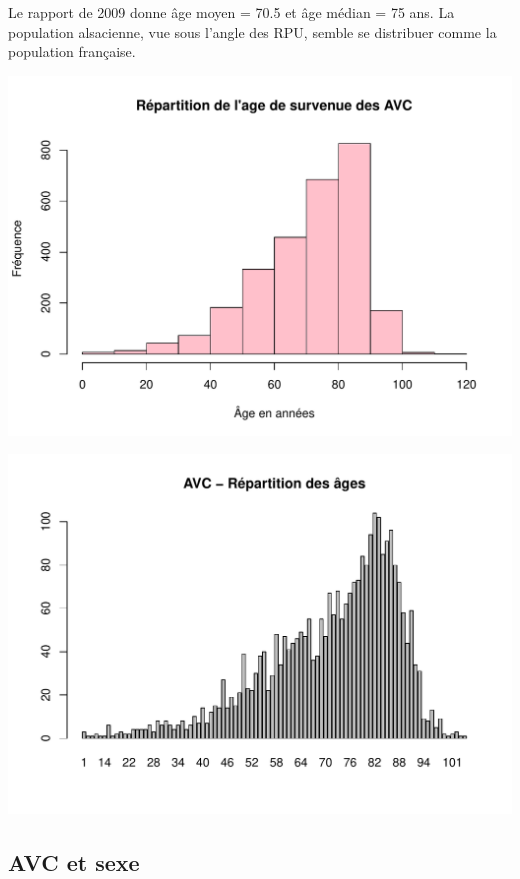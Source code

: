 \documentclass[12pt,english,french,twoside]{book}\usepackage[]{graphicx}\usepackage[]{color}
\makeatletter
\def\maxwidth{ %
  \ifdim\Gin@nat@width>\linewidth
    \linewidth
  \else
    \Gin@nat@width
  \fi
}
\newenvironment{knitrout}{}{} %
\makeatother
\begin{document}
Le rapport de 2009 donne âge moyen = 70.5 et âge médian = 75 ans. La population alsacienne, vue sous l'angle des RPU, semble se distribuer comme la population française.

\begin{knitrout}
\color{fgcolor}
\includegraphics[width=\maxwidth]{figure/avc_age2-1} 

\includegraphics[width=\maxwidth]{figure/avc_age2-2} 

\end{knitrout}



\subsection*{AVC et sexe}
\end{document}
